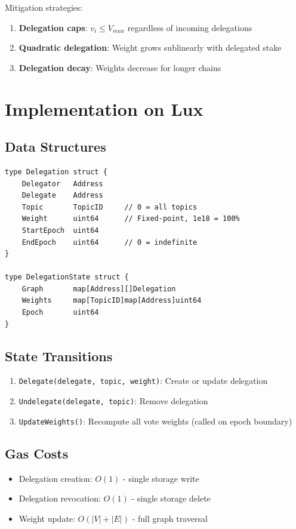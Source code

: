 \documentclass[11pt,a4paper]{article}
\begin{document}
Mitigation strategies:
\begin{enumerate}
    \item \textbf{Delegation caps}: $v_i \leq V_{max}$ regardless of incoming delegations
    \item \textbf{Quadratic delegation}: Weight grows sublinearly with delegated stake
    \item \textbf{Delegation decay}: Weights decrease for longer chains
\end{enumerate}

\section{Implementation on Lux}

\subsection{Data Structures}

\begin{verbatim}
type Delegation struct {
    Delegator   Address
    Delegate    Address
    Topic       TopicID     // 0 = all topics
    Weight      uint64      // Fixed-point, 1e18 = 100%
    StartEpoch  uint64
    EndEpoch    uint64      // 0 = indefinite
}

type DelegationState struct {
    Graph       map[Address][]Delegation
    Weights     map[TopicID]map[Address]uint64
    Epoch       uint64
}
\end{verbatim}

\subsection{State Transitions}

\begin{enumerate}
    \item \texttt{Delegate(delegate, topic, weight)}: Create or update delegation
    \item \texttt{Undelegate(delegate, topic)}: Remove delegation
    \item \texttt{UpdateWeights()}: Recompute all vote weights (called on epoch boundary)
\end{enumerate}

\subsection{Gas Costs}

\begin{itemize}
    \item Delegation creation: $O(1)$ - single storage write
    \item Delegation revocation: $O(1)$ - single storage delete
    \item Weight update: $O(|V| + |E|)$ - full graph traversal
\end{itemize}
\end{document}
